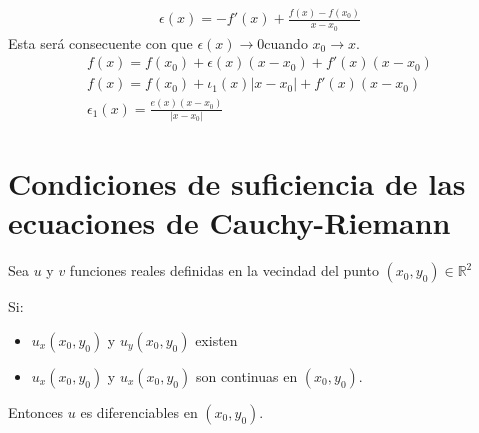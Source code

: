 \documentclass{article}
\newcommand{\caja}[3]{%
  \begin{tcolorbox}[colback=#1!5!white,colframe=#1!25!black,title=#2]
    #3
  \end{tcolorbox}%
}
\begin{document}
\caja{green}{Definicion }{
  \begin{gather*}
    \epsilon(x) = -f'(x)  + \frac{f(x) - f(x_0)}{x-x_0 } 
  \end{gather*}
  Esta será consecuente con que $ \epsilon(x) \rightarrow 0  $cuando $ x_0 \rightarrow x  $.
  \begin{gather*}
    f(x) = f(x_0 ) + \epsilon(x)(x-x_0) + f' (x) (x - x_0)\\
    f(x) = f(x_0 ) + \iota_1(x) \left|x-x_0 \right| + f'(x) (x- x_0 )\\
    \epsilon_1(x) = \frac{e(x) (x- x_0 )}{\left|x - x_0 \right|}
  \end{gather*}
}

\section{Condiciones de suficiencia de las ecuaciones de Cauchy-Riemann}
\caja{green}{Teorema }{
  Sea $  u  $ y $ v  $ funciones reales definidas en la vecindad del punto $ (x_0,y_0 ) \in \mathbb{R}^2  $ 

  Si: 
  \begin{itemize}
    \item $ u_x(x_0,y_0) $ y $ u_y(x_0,y_0) $ existen 
    \item $ u_x(x_0,y_0) $ y $ u_x(x_0,y_0) $ son continuas en $ (x_0,y_0 ) $.
  \end{itemize}
  Entonces $ u  $ es diferenciables en $ (x_0,y_0 ) $.
}
\end{document}
